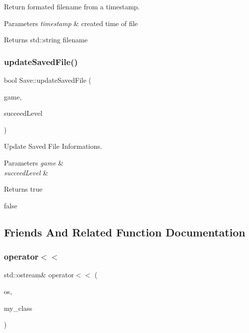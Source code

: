 Return formated filename from a timestamp. 


\begin{DoxyParams}{Parameters}
{\em timestamp} & created time of file \\
\hline
\end{DoxyParams}
\begin{DoxyReturn}{Returns}
std\+::string filename 
\end{DoxyReturn}
\mbox{\label{class_save_a858a98bf0dd78395f5f7bee7bbdc7f57}} 
\subsubsection{\texorpdfstring{update\+Saved\+File()}{updateSavedFile()}}
{\footnotesize\ttfamily bool Save\+::update\+Saved\+File (\begin{DoxyParamCaption}\item[{\hyperlink{class_scene_game}{Scene\+Game} \&}]{game,  }\item[{bool}]{succeed\+Level }\end{DoxyParamCaption})\hspace{0.3cm}{\ttfamily [static]}}



Update Saved File Informations. 


\begin{DoxyParams}{Parameters}
{\em game} & \\
\hline
{\em succeed\+Level} & \\
\hline
\end{DoxyParams}
\begin{DoxyReturn}{Returns}
true 

false 
\end{DoxyReturn}


\subsection{Friends And Related Function Documentation}
\mbox{\label{class_save_a3cd403916354948cd0ec21803ec2f78f}} 
\subsubsection{\texorpdfstring{operator$<$$<$}{operator<<}}
{\footnotesize\ttfamily std\+::ostream\& operator$<$$<$ (\begin{DoxyParamCaption}\item[{std\+::ostream \&}]{os,  }\item[{const \hyperlink{class_save}{Save} \&}]{my\+\_\+class }\end{DoxyParamCaption})\hspace{0.3cm}{\ttfamily [friend]}}



